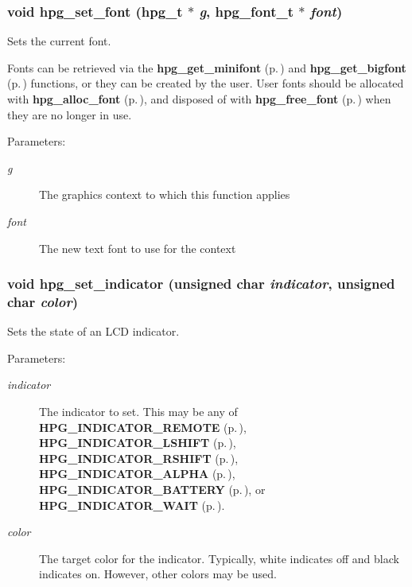 \subsubsection{\setlength{\rightskip}{0pt plus 5cm}void hpg\_\-set\_\-font ({\bf hpg\_\-t} $\ast$ {\em g}, {\bf hpg\_\-font\_\-t} $\ast$ {\em font})}\label{hpgraphics_8h_a69}


Sets the current font.

Fonts can be retrieved via the {\bf hpg\_\-get\_\-minifont} {\rm (p.\,\pageref{hpgraphics_8h_a56})} and {\bf hpg\_\-get\_\-bigfont} {\rm (p.\,\pageref{hpgraphics_8h_a57})} functions, or they can be created by the user. User fonts should be allocated with {\bf hpg\_\-alloc\_\-font} {\rm (p.\,\pageref{hpgraphics_8h_a72})}, and disposed of with {\bf hpg\_\-free\_\-font} {\rm (p.\,\pageref{hpgraphics_8h_a73})} when they are no longer in use.\begin{Desc}
\item[Parameters: ]\par
\begin{description}
\item[{\em 
g}]The graphics context to which this function applies \item[{\em 
font}]The new text font to use for the context \end{description}
\end{Desc}
\subsubsection{\setlength{\rightskip}{0pt plus 5cm}void hpg\_\-set\_\-indicator (unsigned char {\em indicator}, unsigned char {\em color})}\label{hpgraphics_8h_a33}


Sets the state of an LCD indicator.

\begin{Desc}
\item[Parameters: ]\par
\begin{description}
\item[{\em 
indicator}]The indicator to set. This may be any of {\bf HPG\_\-INDICATOR\_\-REMOTE} {\rm (p.\,\pageref{hpgraphics_8h_a18})}, {\bf HPG\_\-INDICATOR\_\-LSHIFT} {\rm (p.\,\pageref{hpgraphics_8h_a19})}, {\bf HPG\_\-INDICATOR\_\-RSHIFT} {\rm (p.\,\pageref{hpgraphics_8h_a20})}, {\bf HPG\_\-INDICATOR\_\-ALPHA} {\rm (p.\,\pageref{hpgraphics_8h_a21})}, {\bf HPG\_\-INDICATOR\_\-BATTERY} {\rm (p.\,\pageref{hpgraphics_8h_a22})}, or {\bf HPG\_\-INDICATOR\_\-WAIT} {\rm (p.\,\pageref{hpgraphics_8h_a23})}. \item[{\em 
color}]The target color for the indicator. Typically, white indicates off and black indicates on. However, other colors may be used. \end{description}
\end{Desc}
